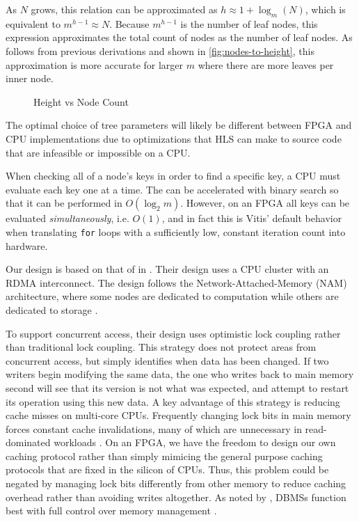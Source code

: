As $N$ grows, this relation can be approximated as $h \approx 1 + \log_m(N)$,
which is equivalent to  $m^{h-1} \approx N$. Because $m^{h-1}$ is the number of
leaf nodes, this expression approximates the total count of nodes as the number
of leaf nodes. As follows from previous derivations and shown in
\autoref{fig:nodes-to-height}, this approximation is more accurate for larger $m$
where there are more leaves per inner node.

\begin{figure}[H]
	\centering
	
	\caption{Height vs Node Count}
	\label{fig:nodes-to-height}
\end{figure}



The optimal choice of tree parameters will likely be different between FPGA and
CPU implementations due to optimizations that HLS can make to source code that
are infeasible or impossible on a CPU.

When checking all of a node's keys in order to find a specific key, a CPU must
evaluate each key one at a time. The can be accelerated with binary search so
that it can be performed in $O(\log_2 m)$. However, on an FPGA all keys can be
evaluated \emph{simultaneously}, i.e. $O(1)$, and in fact this is Vitis' default
behavior when translating \texttt{for} loops with a sufficiently low, constant
iteration count into hardware.


\label{subsec:concurrency}

Our design is based on that of \citeauthor{base} in . Their
design uses a CPU cluster with an RDMA interconnect. The design follows the
Network-Attached-Memory (NAM) architecture, where some nodes are dedicated to
computation while others are dedicated to storage
\autocite{base,binnig-vldb-2016}.

To support concurrent access, their design uses optimistic lock coupling rather
than traditional lock coupling. This strategy does not protect areas from
concurrent access, but simply identifies when data has been changed. If two
writers begin modifying the same data, the one who writes back to main memory
second will see that its version is not what was expected, and attempt to
restart its operation using this new data. A key advantage of this strategy is
reducing cache misses on multi-core CPUs. Frequently changing lock bits in main
memory forces constant cache invalidations, many of which are unnecessary in
read-dominated workloads \autocite{leis-damon-2016}. On an FPGA, we have the
freedom to design our own caching protocol rather than simply mimicing the general purpose
caching protocols that are fixed in the silicon of CPUs. Thus, this problem
could be negated by managing lock bits differently from other memory to reduce
caching overhead rather than avoiding writes altogether. As noted by
\citeauthor{binnig-vldb-2016}, DBMSs function best with full control over memory
management \autocite{binnig-vldb-2016}.



